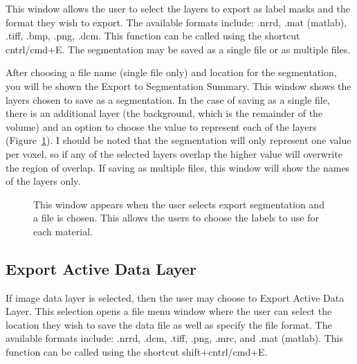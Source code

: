 \documentclass[fleqn,11pt,openany]{book}
\begin{document}
This window allows the user to select the layers to export as label masks and the format they wish to export.  The available formats include: .nrrd, .mat (matlab), .tiff, .bmp, .png, .dcm. This function can be called using the shortcut cntrl/cmd+E.  The segmentation may be saved as a single file or as multiple files.  

After choosing a file name (single file only) and location for the segmentation, you will be shown the Export to Segmentation Summary.  This window shows the layers chosen to save as a segmentation.  In the case of saving as a single file,  there is an additional layer (the background, which is the remainder of the volume)  and an option to choose the value to represent each of the layers (Figure~\ref{fig:ExportSeg_2}).  I should be noted that the segmentation will only represent one value per voxel, so if any of the selected layers overlap the higher value will overwrite the region of overlap.  If saving as multiple files, this window will show the names of the layers only.  

\begin{figure}[h!]
\caption{This window appears when the user selects export segmentation and a file is chosen.  This allows the users to choose the labels to use for each material.  }\label{fig:ExportSeg_2}
\end{figure}

\subsection{Export Active Data Layer}

If image data layer is selected, then the user may choose to Export Active Data Layer. This selection opens a file menu window where the user can select the location they wish to save the data file as well as specify the file format.  The available formats include: .nrrd, .dcm, .tiff, .png, .mrc, and .mat (matlab). This function can be called using the shortcut shift+cntrl/cmd+E.
\end{document}
